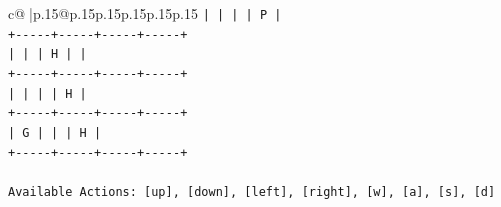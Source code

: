 \documentclass{article}
\begin{document}
{\begin{supertabular}{c@{$\;$}|p{.15\linewidth}@{}p{.15\linewidth}p{.15\linewidth}p{.15\linewidth}p{.15\linewidth}p{.15\linewidth}}
{{{\texttt{|     |     |     |  P  |} \\
\texttt{+{-}{-}{-}{-}{-}+{-}{-}{-}{-}{-}+{-}{-}{-}{-}{-}+{-}{-}{-}{-}{-}+} \\
\texttt{|     |     |  H  |     |} \\
\texttt{+{-}{-}{-}{-}{-}+{-}{-}{-}{-}{-}+{-}{-}{-}{-}{-}+{-}{-}{-}{-}{-}+} \\
\texttt{|     |     |     |  H  |} \\
\texttt{+{-}{-}{-}{-}{-}+{-}{-}{-}{-}{-}+{-}{-}{-}{-}{-}+{-}{-}{-}{-}{-}+} \\
\texttt{|  G  |     |     |  H  |} \\
\texttt{+{-}{-}{-}{-}{-}+{-}{-}{-}{-}{-}+{-}{-}{-}{-}{-}+{-}{-}{-}{-}{-}+} \\
\\ 
\texttt{Available Actions: {[}up{]}, {[}down{]}, {[}left{]}, {[}right{]}, {[}w{]}, {[}a{]}, {[}s{]}, {[}d{]}} \\
            }
        }
    }
     \\ \\


\end{supertabular}}
\end{document}
